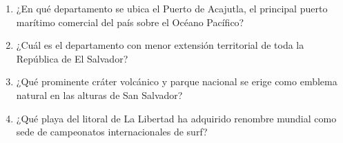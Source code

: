 \documentclass[10pt,a4paper]{article}
\begin{document}
\begin{enumerate}[label=\textbf{\arabic*.}]
\begin{enumerate}[label=\textbf{\Alph*)}]
\end{enumerate}
\vspace{0.15cm}
\item ¿En qué departamento se ubica el Puerto de Acajutla, el principal puerto marítimo comercial del país sobre el Océano Pacífico?
\begin{enumerate}[label=\textbf{\Alph*)}]
\end{enumerate}
\vspace{0.15cm}
\item ¿Cuál es el departamento con menor extensión territorial de toda la República de El Salvador?
\begin{enumerate}[label=\textbf{\Alph*)}]
\end{enumerate}
\vspace{0.15cm}
\item ¿Qué prominente cráter volcánico y parque nacional se erige como emblema natural en las alturas de San Salvador?
\begin{enumerate}[label=\textbf{\Alph*)}]
\end{enumerate}
\vspace{0.15cm}
\item ¿Qué playa del litoral de La Libertad ha adquirido renombre mundial como sede de campeonatos internacionales de surf?
\begin{enumerate}[label=\textbf{\Alph*)}]

\end{enumerate}
\end{enumerate}
\end{document}
